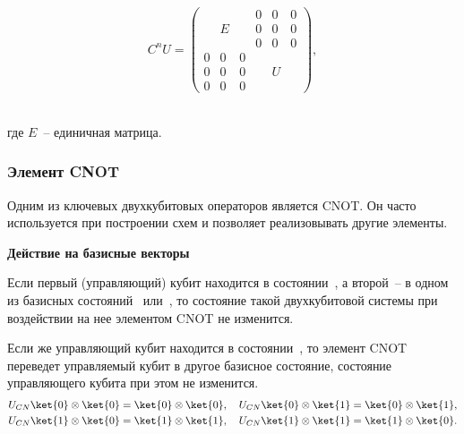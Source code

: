\documentclass[pscyr,notitlepage]{hedwork}
\renewcommand{\~}[1]{\widetilde{#1}}
\begin{document}
  \begin{minipage}{.4\textwidth}
    \center
  \end{minipage}
  \begin{minipage}{.4\textwidth}
    \[
      C^nU =
      \begin{pmatrix}
          &   &   & 0 & 0 & 0 \\[-1.7ex]
          & E &   & 0 & 0 & 0 \\[-1.7ex]
          &   &   & 0 & 0 & 0 \\[-1.7ex]
        0 & 0 & 0 &   &   &   \\[-1.7ex]
        0 & 0 & 0 &   & U &   \\[-1.7ex]
        0 & 0 & 0 &   &   & 
      \end{pmatrix},
    \]
  \end{minipage} \\
  где \( E \)~-- единичная матрица.~\cite{task}
  
  \subsubsection{Элемент CNOT}
  
  Одним из ключевых двухкубитовых операторов является CNOT. Он часто
  используется при построении схем и позволяет реализовывать другие
  элементы.~\cite{main,task}
  
  \textbf{Действие на базисные векторы}
  
  Если первый (управляющий) кубит находится в состоянии~,
  а второй~-- в одном из базисных состояний~ или~, то состояние
  такой двухкубитовой системы при воздействии на нее элементом CNOT не
  изменится.
  
  Если же управляющий кубит находится в состоянии~, то элемент CNOT
  переведет управляемый кубит в другое базисное состояние, состояние
  управляющего кубита при этом не изменится.
  \begin{gather*}
    U_{CN}\ket{0} \otimes \ket{0} = \ket{0} \otimes \ket{0}, \quad
      U_{CN}\ket{0} \otimes \ket{1} = \ket{0} \otimes \ket{1}, \\
    U_{CN}\ket{1} \otimes \ket{0} = \ket{1} \otimes \ket{1}, \quad
      U_{CN}\ket{1} \otimes \ket{1} = \ket{1} \otimes \ket{0}.
  \end{gather*}
  
\end{document}
